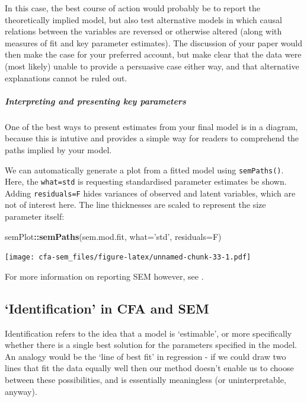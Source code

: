 \documentclass[]{article}
\newenvironment{Shaded}{\begin{snugshade}}{\end{snugshade}}
\newcommand{\KeywordTok}[1]{\textcolor[rgb]{0.13,0.29,0.53}{\textbf{#1}}}
\newcommand{\DataTypeTok}[1]{\textcolor[rgb]{0.13,0.29,0.53}{#1}}
\newcommand{\StringTok}[1]{\textcolor[rgb]{0.31,0.60,0.02}{#1}}
\newcommand{\OperatorTok}[1]{\textcolor[rgb]{0.81,0.36,0.00}{\textbf{#1}}}
\newcommand{\NormalTok}[1]{#1}
\let\oldsubparagraph\subparagraph
\renewcommand{\subparagraph}[1]{\oldsubparagraph{#1}\mbox{}}
\theoremstyle{definition}
\theoremstyle{definition}
\theoremstyle{definition}
\theoremstyle{remark}
\begin{document}
In this case, the best course of action would probably be to report the
theoretically implied model, but also test alternative models in which
causal relations between the variables are reversed or otherwise altered
(along with measures of fit and key parameter estimates). The discussion
of your paper would then make the case for your preferred account, but
make clear that the data were (most likely) unable to provide a
persuasive case either way, and that alternative explanations cannot be
ruled out.

\subparagraph{Interpreting and presenting key
parameters}\label{interpreting-and-presenting-key-parameters}

One of the best ways to present estimates from your final model is in a
diagram, because this is intutive and provides a simple way for readers
to comprehend the paths implied by your model.

We can automatically generate a plot from a fitted model using
\texttt{semPaths()}. Here, the
\texttt{what=\textquotesingle{}std\textquotesingle{}} is requesting
standardised parameter estimates be shown. Adding \texttt{residuals=F}
hides variances of observed and latent variables, which are not of
interest here. The line thicknesses are scaled to represent the size
parameter itself:

\begin{Shaded}
\begin{Highlighting}[]
\NormalTok{semPlot}\OperatorTok{::}\KeywordTok{semPaths}\NormalTok{(sem.mod.fit, }\DataTypeTok{what=}\StringTok{'std'}\NormalTok{, }\DataTypeTok{residuals=}\NormalTok{F)}
\end{Highlighting}
\end{Shaded}

\texttt{[image: cfa-sem\_files/figure-latex/unnamed-chunk-33-1.pdf]}

For more information on reporting SEM however, see
\citet{schreiber2006reporting}.

\hypertarget{identification}{\subsection*{\texorpdfstring{`Identification'
in CFA and SEM}{Identification in CFA and SEM}}\label{identification}}

Identification refers to the idea that a model is `estimable', or more
specifically whether there is a single best solution for the parameters
specified in the model. An analogy would be the `line of best fit' in
regression - if we could draw two lines that fit the data equally well
then our method doesn't enable us to choose between these possibilities,
and is essentially meaningless (or uninterpretable, anyway).
\end{document}

